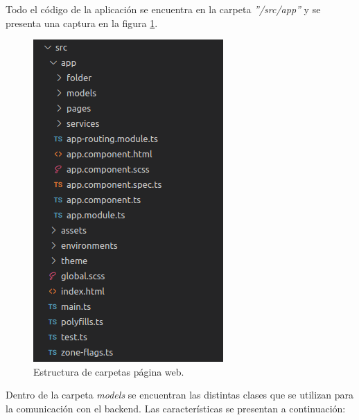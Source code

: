 Todo el código de la aplicación se encuentra en la carpeta \textit{''/src/app''} y se presenta una captura en la figura \ref{fig:Carpetas página web.}.


\begin{figure}[ht]
	\centering
	\includegraphics[scale=.60]{./Figures/codigoFront.png}
	\caption{Estructura de carpetas página web.}
	\label{fig:Carpetas página web.}
\end{figure}

Dentro de la carpeta \textit{models} se encuentran las distintas clases que se utilizan para la comunicación con el backend. Las características se presentan a continuación:

